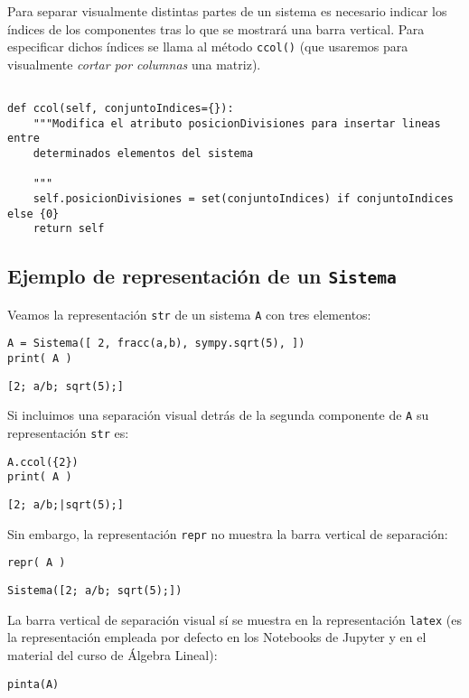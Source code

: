 \documentclass[11pt]{report}
\begin{document}
Para separar visualmente distintas partes de un sistema es necesario
indicar los índices de los componentes tras lo que se mostrará una
barra vertical. Para especificar dichos índices se llama al método
\texttt{ccol()} (que usaremos para visualmente \emph{cortar por columnas} una
matriz).
\begin{verbatim}

def ccol(self, conjuntoIndices={}):
    """Modifica el atributo posicionDivisiones para insertar lineas entre
    determinados elementos del sistema

    """
    self.posicionDivisiones = set(conjuntoIndices) if conjuntoIndices else {0}
    return self

\end{verbatim}

\subsection{Ejemplo de representación de un \texttt{Sistema}}
\label{sec:orgf9cb3f9}
Veamos la representación \texttt{str} de un sistema \texttt{A} con tres elementos:
\begin{verbatim}
A = Sistema([ 2, fracc(a,b), sympy.sqrt(5), ])
print( A )
\end{verbatim}

\texttt{[2; a/b; sqrt(5);]}

Si incluimos una separación visual detrás de la segunda componente de
\texttt{A} su representación \texttt{str} es:
\begin{verbatim}
A.ccol({2})
print( A )
\end{verbatim}

\texttt{[2; a/b;|sqrt(5);]}

Sin embargo, la representación \texttt{repr} no muestra la barra vertical de
separación:
\begin{verbatim}
repr( A )
\end{verbatim}

\texttt{Sistema([2; a/b; sqrt(5);])}

La barra vertical de separación visual sí se muestra en la
representación \texttt{latex} (es la representación empleada por defecto en
los Notebooks de Jupyter y en el material del curso de Álgebra
Lineal):
\begin{verbatim}
pinta(A)
\end{verbatim}
\end{document}
